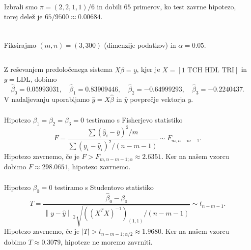 \documentclass[ letterpaper, titlepage, fleqn]{article}
\newcommand{\norm}[1]{\left\lVert#1\right\rVert}
\begin{document}
\subsubsection{}
Izbrali smo $\pi = (2,2,1,1)/6$ in dobili $65$ primerov, ko test zavrne hipotezo, torej delež je $65/9500 \approx 0.00684$.

\section{}
Fiksirajmo $(m, n) = (3, 300)$ (dimenzije  podatkov) in $\alpha = 0.05$.
\subsection{}
\subsubsection{}
Z reševanjem predoločenega sistema $X\hat{\beta} = y$, kjer je $X = [\text{1 TCH HDL TRI}]$ in $y = \text{LDL}$,  dobimo
$$\hat{\beta}_0 = 0.05993031, \quad \hat{\beta}_1 = 0.83909446, \quad \hat{\beta}_2 = -0.64999293, \quad \hat{\beta}_3 = -0.2240437.$$
V nadaljevanju uporabljamo $\hat{y} = X \hat{\beta}$ in $\bar{y}$ povprečje vektorja $y$. 

\subsubsection{}
Hipotezo $\beta_1 = \beta_2 = \beta_3 = 0$ testiramo s Fisherjevo statistiko
$$F = \frac{\sum (\hat{y}_i - \bar{y})^2 / m}{\sum (y_i - \hat{y}_i)^2 / (n-m-1)} \sim F_{m, n-m-1}.$$
Hipotezo zavrnemo, če je $F > F_{m, n-m-1; \alpha} \approx 2.6351$. Ker na našem vzorcu dobimo $F \approx 298.0651$, hipotezo zavrnemo.

\subsubsection{}
Hipotezo $\beta_0 = 0$ testiramo s Studentovo statistiko
$$T = \frac{\hat{\beta}_0 - \beta_0}{\norm{y - \hat{y}}_2 \sqrt{\left((X^T X)^{-1}\right)_{(1,1)}/ (n-m-1)}} \sim t_{n-m-1}.$$
Hipotezo zavrnemo, če je $|T| > t_{n-m-1; \alpha/2} \approx 1.9680$. Ker na našem vzorcu dobimo $T \approx 0.3079$, hipoteze ne moremo zavrniti.

\subsection{}
\end{document}
